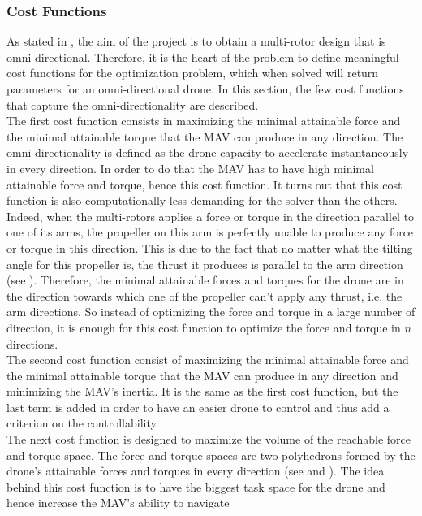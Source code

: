 \subsubsection{Cost Functions}
\label{sec:cost_functions}
As stated in , the aim of the project is to obtain a multi-rotor
design that is omni-directional. Therefore, it is the heart of the problem to
define meaningful cost functions for the optimization problem, which when
solved will return parameters for an omni-directional drone. In this section,
the few cost functions that capture the omni-directionality are described.\\
The first cost function consists in maximizing the minimal attainable force and
the minimal attainable torque that the MAV can produce in any direction. The
omni-directionality is defined as the drone capacity to accelerate instantaneously
in every direction. In order to do that the MAV has to have high minimal attainable
force and torque, hence this cost function. It turns out that this cost function is also
computationally less demanding for the solver than the others. Indeed, when the multi-rotors applies a
force or torque in the direction parallel to one of its arms, the propeller on this arm
is perfectly unable to produce any force or torque in this direction. This is due to
the fact that no matter what the tilting angle for this propeller is, the thrust it
produces is parallel to the arm direction (see ). Therefore,
the minimal attainable forces and torques for the drone are in the direction towards which
one of the propeller can't apply any thrust, i.e. the arm directions. So instead of optimizing the force
and torque in a large number of direction, it is enough for this cost function to
optimize the force and torque in $n$ directions.\\
The second cost function consist of maximizing the minimal attainable force
and the minimal attainable torque that the MAV can produce in any direction
and minimizing the MAV’s inertia. It is the same as the first cost function, but
the last term is added in order to have an easier drone to control and thus add
a criterion on the controllability.\\
The next cost function is designed to maximize the volume of the reachable
force and torque space. The force and torque spaces are two polyhedrons formed
by the drone’s attainable forces and torques in every direction (see 
and ). The idea behind this cost function is to have the
biggest task space for the drone and hence increase the MAV’s ability to navigate
